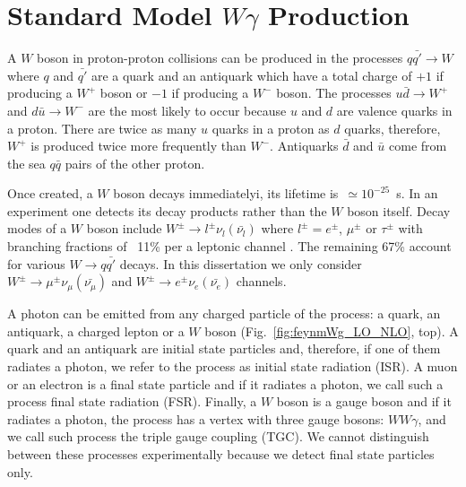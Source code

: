 \section{Standard Model $W\gamma$ Production}
\label{sec:WgAbout_SMproduction}

A $W$ boson in proton-proton collisions can be produced in the processes $q {\bar{q'}} \rightarrow W$ where $q$ and $\bar{q'}$ are a quark and an antiquark which have a total charge of $+1$ if producing a $W^+$ boson or $-1$ if producing a $W^-$ boson. The processes $u\bar{d}\rightarrow W^+$ and $d\bar{u}\rightarrow W^-$ are the most likely to occur because $u$ and $d$ are valence quarks in a proton. There are twice as many $u$ quarks in a proton as $d$ quarks, therefore, $W^+$ is produced twice more frequently than $W^-$. Antiquarks $\bar{d}$ and $\bar{u}$ come from the sea $q\bar{q}$ pairs of the other proton.

Once created, a $W$ boson decays immediatelyi, its lifetime is~$\simeq 10^{-25}$~s. In an experiment one detects its decay products rather than the $W$ boson itself. Decay modes of a $W$ boson include $W^\pm \rightarrow l^\pm \nu_l ({\bar{\nu_l}})$ where $l^\pm=e^\pm$, $\mu^\pm$ or $\tau^\pm$ with branching fractions of ~11\% per a leptonic channel \cite{ref_PDG}. The remaining 67\% account for various $W\rightarrow q\bar{q'}$ decays. In this dissertation we only consider $W^\pm \rightarrow \mu^\pm \nu_\mu ({\bar{\nu_\mu}})$ and $W^\pm \rightarrow e^\pm \nu_e ({\bar{\nu_e}})$ channels.


A photon can be emitted from any charged particle of the process: a quark, an antiquark, a charged lepton or a $W$ boson (Fig.~\ref{fig:feynmWg_LO_NLO}, top). A quark and an antiquark are initial state particles and, therefore, if one of them radiates a photon, we refer to the process as initial state radiation (ISR). A muon or an electron is a final state particle and if it radiates a photon, we call such a process final state radiation (FSR). Finally, a $W$ boson is a gauge boson and if it radiates a photon, the process has a vertex with three gauge bosons: $WW\gamma$, and we call such process the triple gauge coupling (TGC). We cannot distinguish between these processes experimentally because we detect final state particles only.

